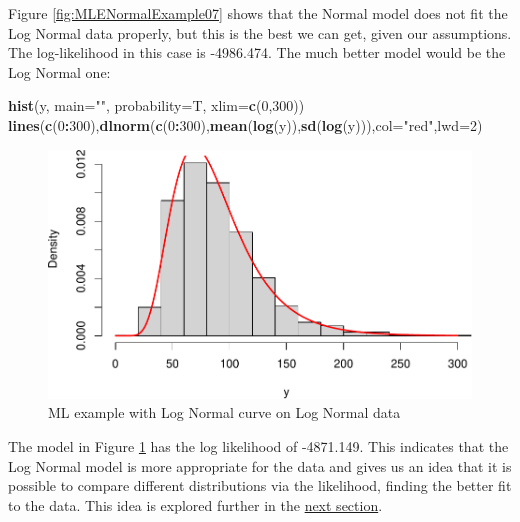 \documentclass[
]{book}
\newenvironment{Shaded}{\begin{snugshade}}{\end{snugshade}}
\newcommand{\DataTypeTok}[1]{\textcolor[rgb]{0.13,0.29,0.53}{#1}}
\newcommand{\DecValTok}[1]{\textcolor[rgb]{0.00,0.00,0.81}{#1}}
\newcommand{\KeywordTok}[1]{\textcolor[rgb]{0.13,0.29,0.53}{\textbf{#1}}}
\newcommand{\NormalTok}[1]{#1}
\newcommand{\OperatorTok}[1]{\textcolor[rgb]{0.81,0.36,0.00}{\textbf{#1}}}
\newcommand{\StringTok}[1]{\textcolor[rgb]{0.31,0.60,0.02}{#1}}
\theoremstyle{definition}
\theoremstyle{definition}
\theoremstyle{definition}
\theoremstyle{definition}
\theoremstyle{remark}
\begin{document}
Figure \ref{fig:MLENormalExample07} shows that the Normal model does not fit the Log Normal data properly, but this is the best we can get, given our assumptions. The log-likelihood in this case is -4986.474. The much better model would be the Log Normal one:

\begin{Shaded}
\begin{Highlighting}[]
\KeywordTok{hist}\NormalTok{(y, }\DataTypeTok{main=}\StringTok{""}\NormalTok{, }\DataTypeTok{probability=}\NormalTok{T, }\DataTypeTok{xlim=}\KeywordTok{c}\NormalTok{(}\DecValTok{0}\NormalTok{,}\DecValTok{300}\NormalTok{))}
\KeywordTok{lines}\NormalTok{(}\KeywordTok{c}\NormalTok{(}\DecValTok{0}\OperatorTok{:}\DecValTok{300}\NormalTok{),}\KeywordTok{dlnorm}\NormalTok{(}\KeywordTok{c}\NormalTok{(}\DecValTok{0}\OperatorTok{:}\DecValTok{300}\NormalTok{),}\KeywordTok{mean}\NormalTok{(}\KeywordTok{log}\NormalTok{(y)),}\KeywordTok{sd}\NormalTok{(}\KeywordTok{log}\NormalTok{(y))),}\DataTypeTok{col=}\StringTok{"red"}\NormalTok{,}\DataTypeTok{lwd=}\DecValTok{2}\NormalTok{)}
\end{Highlighting}
\end{Shaded}

\begin{figure}
\centering
\includegraphics{Svetunkov---Statistics-for-Business-Analytics_files/figure-latex/MLENormalExample08-1.pdf}
\caption{\label{fig:MLENormalExample08}ML example with Log Normal curve on Log Normal data}
\end{figure}

The model in Figure \ref{fig:MLENormalExample08} has the log likelihood of -4871.149. This indicates that the Log Normal model is more appropriate for the data and gives us an idea that it is possible to compare different distributions via the likelihood, finding the better fit to the data. This idea is explored further in the \protect\hyperlink{modelSelection}{next section}.
\end{document}
